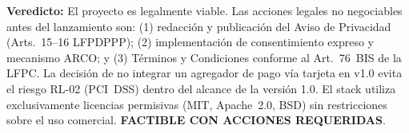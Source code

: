 \noindent\textbf{Veredicto:} El proyecto es legalmente viable. Las acciones legales
no negociables antes del lanzamiento son: (1) redacci\'on y publicaci\'on del Aviso de
Privacidad (Arts.~15--16 LFPDPPP); (2) implementaci\'on de consentimiento expreso y
mecanismo ARCO; y (3) T\'erminos y Condiciones conforme al Art.~76~BIS de la LFPC.
La decisi\'on de no integrar un agregador de pago v\'ia tarjeta en v1.0 evita el riesgo
RL-02 (PCI~DSS) dentro del alcance de la versión 1.0. El stack utiliza exclusivamente
licencias permisivas (MIT, Apache~2.0, BSD) sin restricciones sobre el uso comercial.
\textbf{FACTIBLE CON ACCIONES REQUERIDAS}.


